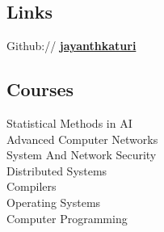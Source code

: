 \documentclass[letterpaper]{deedy-resume} %
\begin{document}
\begin{minipage}[t]{0.31\textwidth}
\subsection{Links} 

Github:// \href{https://github.com/jayanthkaturi}{\bf jayanthkaturi} \\
\sectionspace %



\subsection{Courses}

\textbullet{}Statistical Methods in AI \\
\textbullet{}Advanced Computer Networks \\
\textbullet{}System And Network Security \\
\textbullet{}Distributed Systems \\
\textbullet{}Compilers \\
\textbullet{}Operating Systems \\
\textbullet{}Computer Programming \\

\sectionspace %




\end{minipage} %
\hfill
%
%
\end{document}
